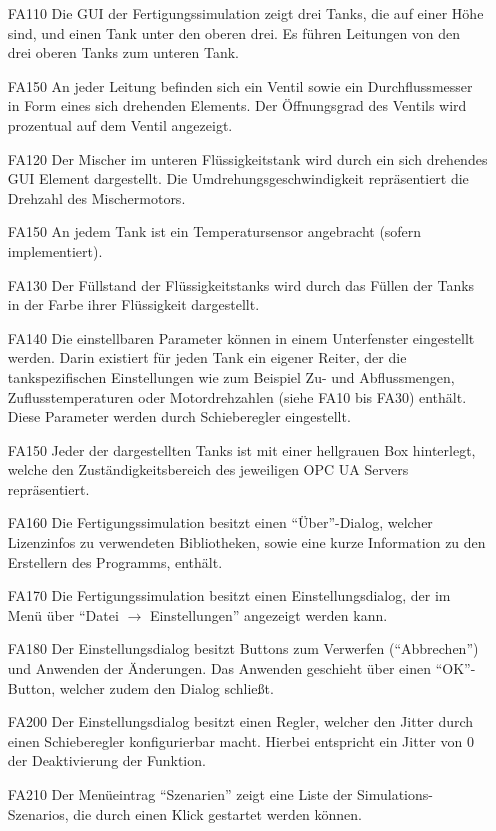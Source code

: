 \documentclass[parskip=full]{scrartcl}
\begin{document}
\begin{enumerate}
\item[FA110] Die \gls{GUI} der \gls{Fertigungssimulation} zeigt drei Tanks, die auf einer Höhe sind, und einen Tank unter den oberen drei.
Es führen Leitungen von den drei oberen Tanks zum unteren Tank.
\item[FA150] An jeder Leitung befinden sich ein Ventil sowie ein Durchflussmesser in Form eines sich drehenden Elements. Der Öffnungsgrad des Ventils wird prozentual auf dem Ventil angezeigt.
\item[FA120] Der Mischer im unteren Flüssigkeitstank wird durch ein sich drehendes GUI Element dargestellt.
Die Umdrehungsgeschwindigkeit repräsentiert die Drehzahl des Mischermotors.
\item[FA150] An jedem Tank ist ein Temperatursensor angebracht (sofern implementiert).
\item[FA130] Der Füllstand der Flüssigkeitstanks wird durch das Füllen der Tanks in der Farbe ihrer Flüssigkeit dargestellt.
\item[FA140] Die einstellbaren Parameter können in einem Unterfenster eingestellt werden. Darin existiert für jeden Tank ein eigener Reiter, der die 
tankspezifischen Einstellungen wie zum Beispiel Zu- und Abflussmengen, Zuflusstemperaturen oder Motordrehzahlen (siehe FA10 bis FA30) enthält.
Diese Parameter werden durch Schieberegler eingestellt.
\item[FA150] Jeder der dargestellten Tanks ist mit einer hellgrauen Box hinterlegt, welche den Zuständigkeitsbereich des jeweiligen \gls{OPC UA} Servers repräsentiert.
\item[FA160] Die \gls{Fertigungssimulation} besitzt einen "`Über"'-Dialog, welcher Lizenzinfos zu verwendeten Bibliotheken,
  sowie eine kurze Information zu den Erstellern des Programms, enthält.
\item[FA170] Die \gls{Fertigungssimulation} besitzt einen Einstellungsdialog, der im Menü über "`Datei $\rightarrow$ Einstellungen"' angezeigt werden kann.
\item[FA180] Der Einstellungsdialog besitzt Buttons zum Verwerfen ("`Abbrechen"') und Anwenden der Änderungen. Das Anwenden geschieht über einen "`OK"'-Button, welcher zudem den Dialog schließt.
\item[FA200] Der Einstellungsdialog besitzt einen Regler, welcher den \gls{Jitter} durch einen Schieberegler konfigurierbar macht.
  Hierbei entspricht ein \gls{Jitter} von 0 der Deaktivierung der Funktion.
\item[FA210] Der Menüeintrag "`Szenarien"' zeigt eine Liste der \glspl{Simulations-Szenario}, die durch einen Klick gestartet werden können.
\end{enumerate}
\end{document}
